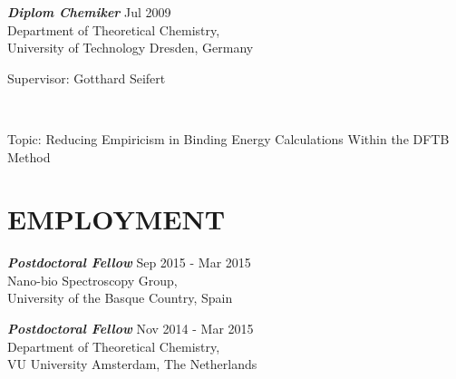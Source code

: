 \documentclass[line,margin]{res}
\begin{document}
\begin{resume}
{\sl\textbf{Diplom Chemiker}} \hfill{} Jul 2009 \\
                \hspace*{1cm} Department of Theoretical Chemistry,\\ 
                \smallskip\hspace*{1cm} University of Technology Dresden, Germany\\
				\hspace*{.5cm}\parbox[t]{12.5cm}{Supervisor: Gotthard Seifert}\\				\hspace*{.5cm}\parbox[t]{12.5cm}{Topic: Reducing Empiricism in Binding Energy Calculations Within the DFTB Method}%
                   
\section{EMPLOYMENT} {\sl\textbf{Postdoctoral Fellow}} \hfill\smallskip Sep 2015 - Mar 2015\\
                \hspace*{1cm} Nano-bio Spectroscopy Group,\\ 
                \hspace*{1cm} University of the Basque Country, Spain
                                
                {\sl\textbf{Postdoctoral Fellow}} \hfill\smallskip Nov 2014 - Mar 2015\\
                \hspace*{1cm} Department of Theoretical Chemistry,\\ 
                \hspace*{1cm} VU University Amsterdam, The Netherlands
                

\end{resume}
\end{document}

